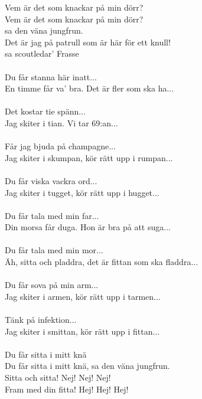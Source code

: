 \vspace{10pt}
\revrpt Vem är det som knackar på min dörr?\rpt\\
Vem är det som knackar på min dörr?\\
sa den väna jungfrun.\\
\revrpt Det är jag på patrull som är här för ett knull!\\
sa scoutledar' Frasse\rpt\\
\\
Du får stanna här inatt...\\
En timme får va' bra. Det är fler som ska ha...\\
\\
Det kostar tie spänn...\\
Jag skiter i tian. Vi tar 69:an...\\
\\
Får jag bjuda på champagne...\\
Jag skiter i skumpan, kör rätt upp i rumpan...\\
\\
Du får viska vackra ord...\\
Jag skiter i tugget, kör rätt upp i hugget...\\
\\
Du får tala med min far...\\
Din morsa får duga. Hon är bra på att suga...\\
\\
Du får tala med min mor...\\
Äh, sitta och pladdra, det är fittan som ska fladdra...\\
\\
Du får sova på min arm...\\
Jag skiter i armen, kör rätt upp i tarmen...\\
\\
Tänk på infektion...\\
Jag skiter i smittan, kör rätt upp i fittan...\\
\\
\revrpt Du får sitta i mitt knä\rpt\\
Du får sitta i mitt knä, sa den väna jungfrun.\\
Sitta och sitta! Nej! Nej! Nej!\\
Fram med din fitta! Hej! Hej! Hej!

